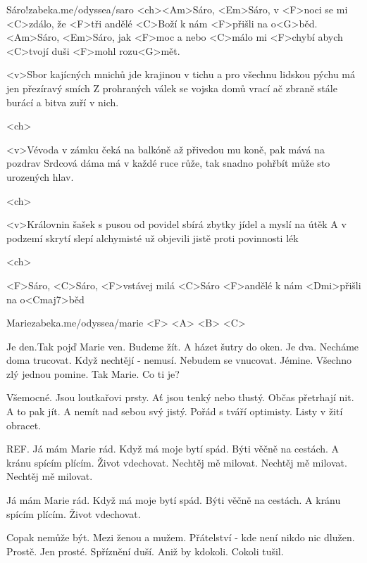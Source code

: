 


\songtitlepage

\listofsong

\begin{song}[Traband]{1}{Sáro!}{zabeka.me/odyssea/saro}
<ch><Am>Sáro, <Em>Sáro, v <F>noci se mi <C>zdálo,
že <F>tři andělé <C>Boží k nám <F>přišli na o<G>běd.
<Am>Sáro, <Em>Sáro, jak <F>moc a nebo <C>málo
mi <F>chybí abych <C>tvojí duši <F>mohl rozu<G>mět.

<v>Sbor kajícných mnichů jde krajinou v tichu 
a pro všechnu lidskou pýchu má jen přezíravý smích 
Z prohraných válek se vojska domů vrací 
ač zbraně stále burácí a bitva zuří v nich.

<ch>

<v>Vévoda v zámku čeká na balkóně 
až přivedou mu koně, pak mává na pozdrav 
Srdcová dáma má v každé ruce růže, 
tak snadno pohřbít může sto urozených hlav.

<ch>

<v>Královnin šašek s pusou od povidel 
sbírá zbytky jídel a myslí na útěk 
A v podzemí skrytí slepí alchymisté 
už objevili jistě proti povinnosti lék

<ch>

<F>Sáro, <C>Sáro, <F>vstávej milá <C>Sáro 
<F>andělé k nám <Dmi>přišli na o<Cmaj7>běd


\end{song}
\begin{song}[]{2}{Marie}{zabeka.me/odyssea/marie}
<F> <A> <B> <C>

Je den.Tak pojď Marie ven.
Budeme žít. A házet šutry do oken.
Je dva. Necháme doma trucovat.
Když nechtějí - nemusí. Nebudem se vnucovat. 
Jémine. Všechno zlý jednou pomine.
Tak Marie. Co ti je?

Všemocné. Jsou loutkařovi prsty.
Ať jsou tenký nebo tlustý. Občas přetrhají nit.
A to pak jít. A nemít nad sebou svý jistý.
Pořád s tváří optimisty. Listy v žití obracet.

REF.
Já mám Marie rád. Když má moje bytí spád.
Býti věčně na cestách. A kránu spícím plícím.
Život vdechovat. Nechtěj mě milovat.
Nechtěj mě milovat. Nechtěj mě milovat.

Já mám Marie rád. Když má moje bytí spád.
Býti věčně na cestách. A kránu spícím plícím.
Život vdechovat.

Copak nemůže být. Mezi ženou a mužem.
Přátelství - kde není nikdo nic dlužen. Prostě.
Jen prosté. Spříznění duší.
Aniž by kdokoli. Cokoli tušil.

\end{song}
